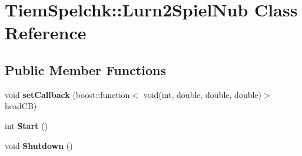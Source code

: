 \hypertarget{class_tiem_spelchk_1_1_lurn2_spiel_nub}{\section{Tiem\-Spelchk\-:\-:Lurn2\-Spiel\-Nub Class Reference}
\label{class_tiem_spelchk_1_1_lurn2_spiel_nub}
}
\subsection*{Public Member Functions}
\begin{DoxyCompactItemize}
\item 
\hypertarget{class_tiem_spelchk_1_1_lurn2_spiel_nub_a3a84a37ba97831308f639b9e2bf7d9f8}{void {\bfseries set\-Callback} (boost\-::function$<$ void(int, double, double, double)$>$ head\-C\-B)}\label{class_tiem_spelchk_1_1_lurn2_spiel_nub_a3a84a37ba97831308f639b9e2bf7d9f8}

\item 
\hypertarget{class_tiem_spelchk_1_1_lurn2_spiel_nub_a29b93d8ad5bbcefad6df00b4a23f4fc4}{int {\bfseries Start} ()}\label{class_tiem_spelchk_1_1_lurn2_spiel_nub_a29b93d8ad5bbcefad6df00b4a23f4fc4}

\item 
\hypertarget{class_tiem_spelchk_1_1_lurn2_spiel_nub_a7c055489ec5c140e7bfa91a0c0a76f94}{void {\bfseries Shutdown} ()}\label{class_tiem_spelchk_1_1_lurn2_spiel_nub_a7c055489ec5c140e7bfa91a0c0a76f94}

\end{DoxyCompactItemize}
